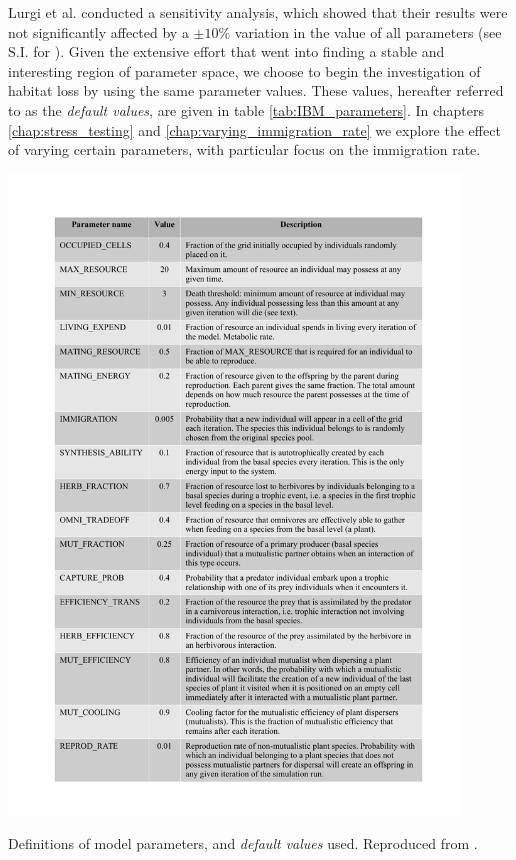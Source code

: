 Lurgi et al. conducted a sensitivity analysis, which showed that their results were not significantly affected by a $\pm 10\%$ variation in the value of all parameters (see S.I. for \cite{lurgi2015effects}). Given the extensive effort that went into finding a stable and interesting region of parameter space, we choose to begin the investigation of habitat loss by using the same parameter values. These values, hereafter referred to as the \emph{default values}, are given in table \ref{tab:IBM_parameters}. In chapters \ref{chap:stress_testing} and \ref{chap:varying_immigration_rate} we explore the effect of varying certain parameters, with particular focus on the immigration rate.


\begin{table}[hp!]
\centering
\includegraphics[width=0.9\textwidth]{"tables/IBM_parameters"}
\caption{Definitions of model parameters, and \emph{default values} used. Reproduced from \cite{lurgi2015effects}.}
\label{tab:IBM_parameters}
\end{table}

